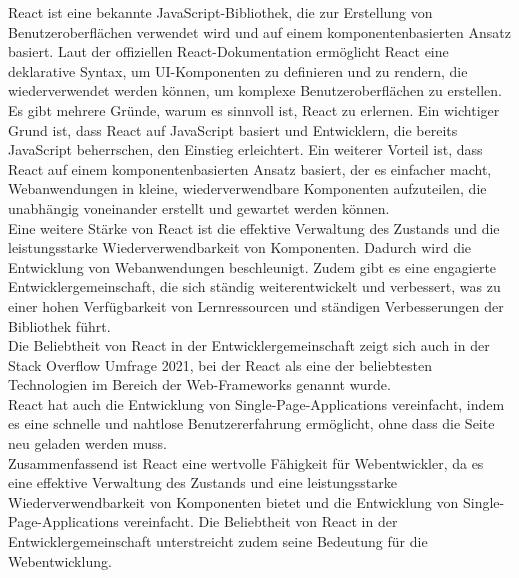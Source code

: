 React ist eine bekannte JavaScript-Bibliothek, die zur Erstellung von Benutzeroberflächen verwendet wird und auf einem komponentenbasierten Ansatz basiert. Laut der offiziellen React-Dokumentation ermöglicht React eine deklarative Syntax, um UI-Komponenten zu definieren und zu rendern, die wiederverwendet werden können, um komplexe Benutzeroberflächen zu erstellen.\cite{ReactJS} \\
Es gibt mehrere Gründe, warum es sinnvoll ist, React zu erlernen. Ein wichtiger Grund ist, dass React auf JavaScript basiert und Entwicklern, die bereits JavaScript beherrschen, den Einstieg erleichtert. Ein weiterer Vorteil ist, dass React auf einem komponentenbasierten Ansatz basiert, der es einfacher macht, Webanwendungen in kleine, wiederverwendbare Komponenten aufzuteilen, die unabhängig voneinander erstellt und gewartet werden können.\cite{Kinsta} \\
Eine weitere Stärke von React ist die effektive Verwaltung des Zustands und die leistungsstarke Wiederverwendbarkeit von Komponenten. Dadurch wird die Entwicklung von Webanwendungen beschleunigt. Zudem gibt es eine engagierte Entwicklergemeinschaft, die sich ständig weiterentwickelt und verbessert, was zu einer hohen Verfügbarkeit von Lernressourcen und ständigen Verbesserungen der Bibliothek führt.\cite{Kinsta}\\
Die Beliebtheit von React in der Entwicklergemeinschaft zeigt sich auch in der Stack Overflow Umfrage 2021, bei der React als eine der beliebtesten Technologien im Bereich der Web-Frameworks genannt wurde.\cite{StackOverflowSurvey}\\
React hat auch die Entwicklung von Single-Page-Applications vereinfacht, indem es eine schnelle und nahtlose Benutzererfahrung ermöglicht, ohne dass die Seite neu geladen werden muss.\cite{Kinsta}\\
Zusammenfassend ist React eine wertvolle Fähigkeit für Webentwickler, da es eine effektive Verwaltung des Zustands und eine leistungsstarke Wiederverwendbarkeit von Komponenten bietet und die Entwicklung von Single-Page-Applications vereinfacht. Die Beliebtheit von React in der Entwicklergemeinschaft unterstreicht zudem seine Bedeutung für die Webentwicklung.

